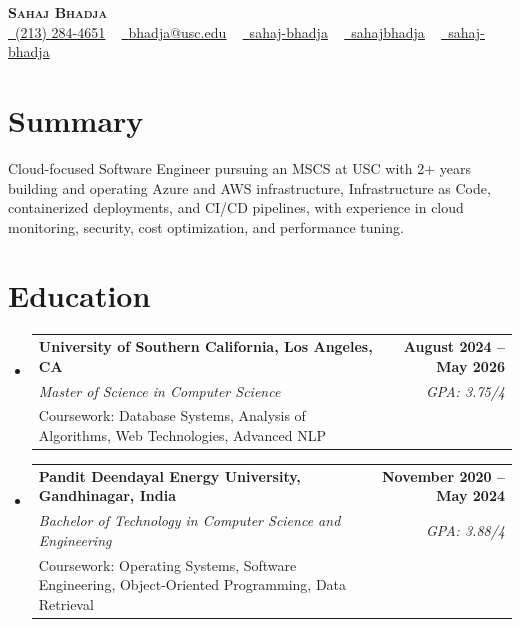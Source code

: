 \documentclass[letterpaper,10pt]{article}
\makeatletter
\newcommand{\resumeEduSubheading}[5]{\vspace{-1pt}\item\begin{tabular*}{1.0\textwidth}[t]{l@{\extracolsep{\fill}}r}\textbf{#1} & \textbf{\small #2} \\\textit{\small #3} & \textit{\small #4} \\\small #5 & \\\end{tabular*}\vspace{-4pt}}
\newcommand{\resumeSubHeadingListStart}{\begin{itemize}[leftmargin=0.0in, label={}]}
\newcommand{\resumeSubHeadingListEnd}{\end{itemize}}
\makeatother
\begin{document}
\begin{center}
{\Huge \scshape \textbf{Sahaj Bhadja}} \\ \vspace{1pt}
\small \href{tel:(213) 284-4651}{\faPhone\ \underline{(213) 284-4651}} ~ \href{mailto: bhadja@usc.edu}{\raisebox{-0.2\height}\faEnvelope\ \underline{bhadja@usc.edu}} ~
\href{https://www.linkedin.com/in/sahaj-bhadja/}{\raisebox{-0.2\height}\faLinkedin\ \underline{sahaj-bhadja}} ~ \href{https://github.com/SAHAJ-BHADJA}{\raisebox{-0.2\height}\faGithub\ \underline{sahajbhadja}} ~
\href{https://sahaj-bhadja.vercel.app/}{\raisebox{-0.2\height}\faGlobe\ \underline{sahaj-bhadja}}
\end{center}
\vspace{-16pt}
\section{Summary}
\begin{itemize}[leftmargin=0.15in, label={}]
\small{\item{Cloud-focused Software Engineer pursuing an MSCS at USC with 2+ years building and operating Azure and AWS infrastructure, Infrastructure as Code, containerized deployments, and CI/CD pipelines, with experience in cloud monitoring, security, cost optimization, and performance tuning.}}
\end{itemize}
\vspace{-6pt}
\section{Education}
\resumeSubHeadingListStart
\resumeEduSubheading{University of Southern California, Los Angeles, CA}{August 2024 -- May 2026}{Master of Science in Computer Science}{GPA: 3.75/4}{Coursework: Database Systems, Analysis of Algorithms, Web Technologies, Advanced NLP}
\vspace{-9pt}
\resumeEduSubheading{Pandit Deendayal Energy University, Gandhinagar, India}{November 2020 -- May 2024}{Bachelor of Technology in Computer Science and Engineering}{GPA: 3.88/4}{Coursework: Operating Systems, Software Engineering, Object-Oriented Programming, Data Retrieval}
\resumeSubHeadingListEnd
\vspace{-6pt}
\end{document}
